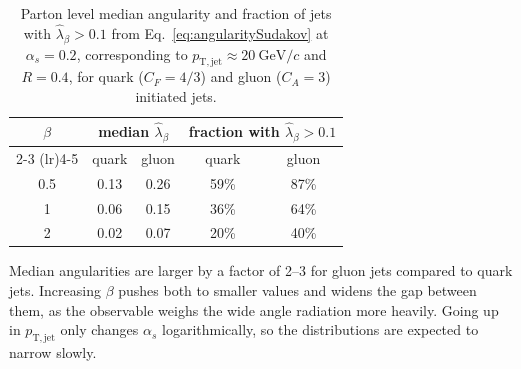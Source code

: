 \begin{table}[htbp]
	\centering
	\begin{tabular}{c c c c c}
		\toprule
		\multirow{2}{*}{\(\beta\)} & \multicolumn{2}{c}{median \(\hat{\lambda}_\beta\)} & \multicolumn{2}{c}{fraction with \(\hat{\lambda}_\beta > 0.1\)}                 \\
		\cmidrule(lr){2-3} \cmidrule(lr){4-5}
		                           & quark                                              & gluon                                                           & quark & gluon \\
		\midrule
		0.5                        & 0.13                                               & 0.26                                                            & 59\%  & 87\%  \\
		1                          & 0.06                                               & 0.15                                                            & 36\%  & 64\%  \\
		2                          & 0.02                                               & 0.07                                                            & 20\%  & 40\%  \\
		\bottomrule
	\end{tabular}
	\caption[Leading logarithmic estimates of jet angularities at RHIC]{Parton level median angularity and fraction of jets with \(\hat{\lambda}_\beta > 0.1\) from Eq.~\ref{eq:angularitySudakov} at \(\alpha_s = 0.2\), corresponding to \(p_\mathrm{T, jet} \approx 20~\mathrm{GeV}/c\) and \(R = 0.4\), for quark (\(C_F = 4/3\)) and gluon (\(C_A = 3\)) initiated jets.}
	\label{tab:angularityEstimate}
\end{table}

Median angularities are larger by  a factor of 2--3 for gluon jets compared to quark jets.
%
Increasing \(\beta\) pushes both to smaller values and widens the gap between them, as the observable weighs the wide angle radiation more heavily.
%
Going up in \(p_\mathrm{T, jet}\) only changes \(\alpha_s\) logarithmically, so the distributions are expected to narrow slowly.

